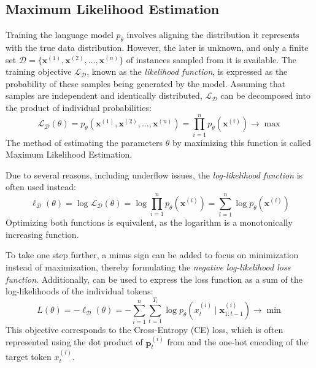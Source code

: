 \subsection{Maximum Likelihood Estimation}

Training the language model \(p_\theta\) involves aligning the distribution it represents with the true data distribution. However, the later is unknown, and only a finite set \(\mathcal{D} = \{\bm{x}^{(1)}, \bm{x}^{(2)}, \ldots, \bm{x}^{(n)}\}\) of instances sampled from it is available. The training objective \(\mathcal{L}_{\mathcal{D}}\), known as the \textit{likelihood function}, is expressed as the probability of these samples being generated by the model. Assuming that samples are independent and identically distributed, \(\mathcal{L}_{\mathcal{D}}\) can be decomposed into the product of individual probabilities:
\begin{equation}
	\mathcal{L}_{\mathcal{D}}(\theta) = p_{\theta}(\bm{x}^{(1)}, \bm{x}^{(2)}, \ldots, \bm{x}^{(n)}) = \prod_{i=1}^{n} p_{\theta}(\bm{x}^{(i)}) \rightarrow \max
\end{equation}
The method of estimating the parameters \(\theta\) by maximizing this function is called Maximum Likelihood Estimation.

Due to several reasons, including underflow issues, the \textit{log-likelihood function} is often used instead:
\begin{equation}
	\ell_{\mathcal{D}}(\theta) = \log \mathcal{L}_{\mathcal{D}}(\theta) = \log \prod_{i=1}^{n} p_{\theta}(\bm{x}^{(i)}) = \sum_{i=1}^{n} \log p_{\theta}(\bm{x}^{(i)})
\end{equation}
Optimizing both functions is equivalent, as the logarithm is a monotonically increasing function.

To take one step further, a minus sign can be added to focus on minimization instead of maximization, thereby formulating the \textit{negative log-likelihood loss function}. Additionally,  can be used to express the loss function as a sum of the log-likelihoods of the individual tokens:
\begin{equation}
	L(\theta) = -\ell_{\mathcal{D}}(\theta) = -\sum_{i=1}^{n} \sum_{t=1}^{T_i} \log p_{\theta}(x^{(i)}_t \mid \bm{x}^{(i)}_{1:t-1}) \rightarrow \min
\end{equation}
This objective corresponds to the Cross-Entropy (CE) loss, which is often represented using the dot product of \(\mathbf{p}^{(i)}_t\) from  and the one-hot encoding of the target token \(x^{(i)}_t\).

